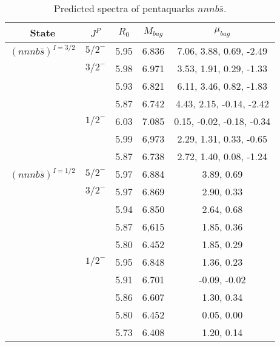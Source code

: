 \documentclass[prd,twocolumn,floatfix,nofootinbib]{revtex4}
\begin{document}
\renewcommand{\tabcolsep}{0.5cm}
\renewcommand{\arraystretch}{1.2}
\begin{table*}[!htbp]
    \caption{Predicted spectra of pentaquarks $nnnb\bar{s}$.}
    \begin{tabular}{ccccc}
        \hline\hline
        {\rm State} &$J^{P}$ &$R_{0}$ &$M_{bag}$ &$\mu_{bag}$ \\ \hline
        ${(nnnb\bar{s})}^{I=3/2}$
            &${5/2}^{-}$    &5.95   &6.836  &7.06, 3.88, 0.69, -2.49 \\
            &${3/2}^{-}$    &5.98   &6.971  &3.53, 1.91, 0.29, -1.33 \\
            &               &5.93   &6.821  &6.11, 3.46, 0.82, -1.83 \\
            &               &5.87   &6.742  &4.43, 2.15, -0.14, -2.42 \\
            &${1/2}^{-}$    &6.03   &7.085  &0.15, -0.02, -0.18, -0.34 \\
            &               &5.99   &6,973  &2.29, 1.31, 0.33, -0.65 \\
            &               &5.87   &6.738  &2.72, 1.40, 0.08, -1.24 \\
        ${(nnnb\bar{s})}^{I=1/2}$
            &${5/2}^{-}$    &5.97   &6.884  &3.89, 0.69 \\
            &${3/2}^{-}$    &5.97   &6.869  &2.90, 0.33 \\
            &               &5.94   &6.850  &2.64, 0.68 \\
            &               &5.87   &6,615  &1.85, 0.36 \\
            &               &5.80   &6.452  &1.85, 0.29 \\
            &${1/2}^{-}$    &5.95   &6.848  &1.36, 0.23 \\
            &               &5.91   &6.701  &-0.09, -0.02 \\
            &               &5.86   &6.607  &1.30, 0.34 \\
            &               &5.80   &6.452  &0.05, 0.00 \\
            &               &5.73   &6.408  &1.20, 0.14 \\
        \hline\hline
    \end{tabular}
\end{table*}
\end{document}
